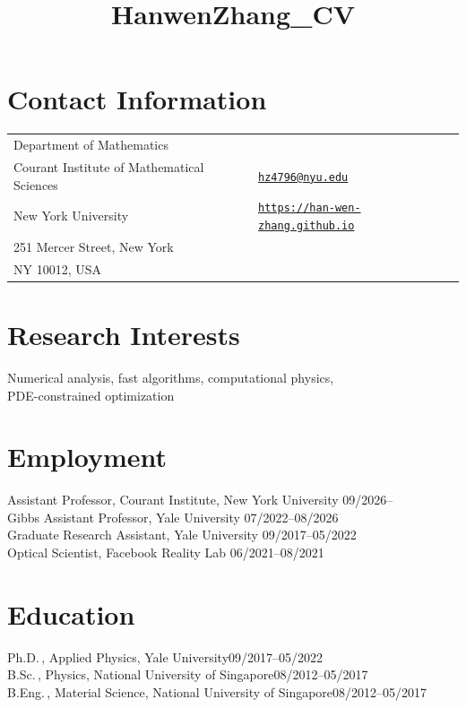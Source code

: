 \documentclass[margin,line,pifont,palatino,courier]{res}
\begin{document}
\title{HanwenZhang_CV}
\begin{resume}

\section{\sc Contact Information}

\vspace{.05in}
\begin{tabular}{@{}p{2.75in}p{2in}}
Department of Mathematics &  \\
Courant Institute of Mathematical Sciences &
\href{mailto:hz4796@nyu.edu}
{\texttt{hz4796@nyu.edu}}\\
New York University &
\href{https://han-wen-zhang.github.io/}
{\texttt{https://han-wen-zhang.github.io}}\\
251 Mercer Street, New York & \\
 NY 10012, USA   & \\
             
\end{tabular}

\section{\sc Research Interests}
Numerical analysis, fast algorithms, computational physics,\\ PDE-constrained optimization

\section{\sc Employment}
Assistant Professor, Courant Institute, New York University \hfill  09/2026-- \hspace*{1.12cm}\\
Gibbs Assistant Professor, Yale University \hfill  07/2022--08/2026\\
Graduate Research Assistant, Yale University \hfill 09/2017--05/2022\\
Optical Scientist, Facebook Reality Lab \hfill 06/2021--08/2021

\section{\sc Education}
Ph.D.\,, Applied Physics, Yale University\hfill 09/2017--05/2022\\
B.Sc.\,, Physics, National University of Singapore\hfill 08/2012--05/2017\\
B.Eng.\,, Material Science, National University of Singapore\hfill 08/2012--05/2017


\end{resume}
\end{document}
